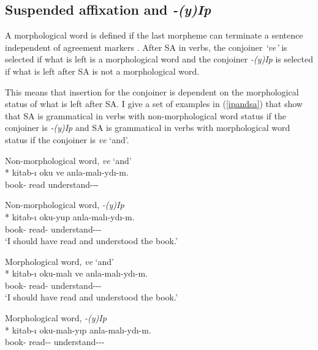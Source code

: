 \subsection{Suspended affixation and \textit{-(y)Ip}} \label{sec:SAandyip}

A morphological word is defined if the last morpheme can terminate a sentence independent of agreement markers \citep{kabak2007turkish}. After SA in verbs, the conjoiner \textit{`ve'} is selected if what is left is a morphological word and the conjoiner \textit{-(y)Ip} is selected if what is left after SA is not a morphological word. 

This means that insertion for the conjoiner is dependent on the morphological status of what is left after SA. I give a set of examples in (\ref{ipandsa}) that show that SA is grammatical in verbs with non-morphological word status if the conjoiner is \textit{-(y)Ip} and SA is grammatical in verbs with morphological word status if the conjoiner is \textit{ve} `and'.

\begin{exe}
\ex \label{ipandsa}
\begin{xlist}
\ex \begin{xlisti}
\ex Non-morphological word, \textit{ve} `and'\\*
\gll *kitab-ı oku ve anla-malı-ydı-m. \\ 
book-{\Acc} read {\And} understand-{\Nec}-{\Pst}-{\Fsg} \\
\glt ${}$

\ex Non-morphological word, \textit{-(y)Ip}\\*
\gll kitab-ı oku-yup anla-malı-ydı-m. \\ 
book-{\Acc} read-{\Pc} understand-{\Nec}-{\Pst}-{\Fsg} \\
\glt `I should have read and understood the book.'
\end{xlisti}

\ex \begin{xlisti}
\ex Morphological word, \textit{ve} `and'\\* 
\gll kitab-ı oku-malı ve anla-malı-ydı-m. \\ 
book-{\Acc} read-{\Nec} {\And} understand-{\Nec}-{\Pst}-{\Fsg} \\
\glt `I should have read and understood the book.'

\ex Morphological word, \textit{-(y)Ip}\\*
\gll *kitab-ı oku-malı-yıp anla-malı-ydı-m. \\ 
book-{\Acc} read-{\Nec}-{\Pc} understand-{\Nec}-{\Pst}-{\Fsg} \\
\glt ${}$
\end{xlisti}
\end{xlist}
\end{exe}

